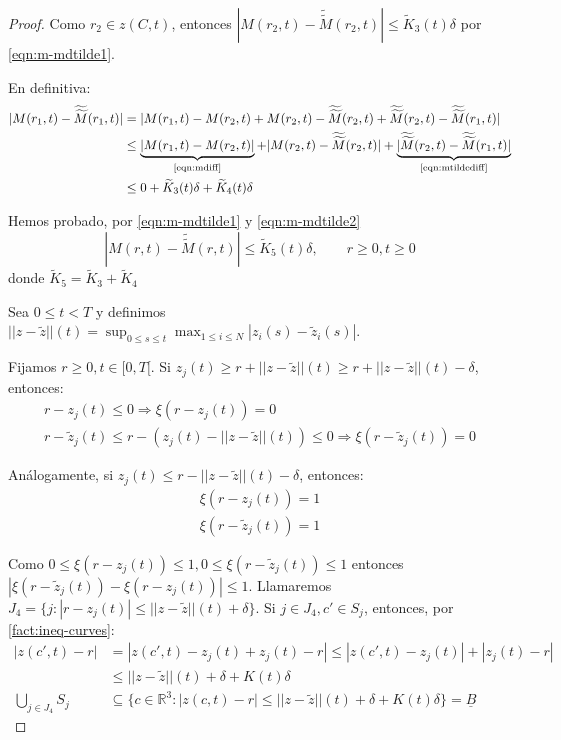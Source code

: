 \documentclass[a4paper,10pt]{scrartcl}
\theoremstyle{definition}
\newcommand{\ktilde}{\widetilde{K}}
\newcommand{\dtilde}[1]{\widetilde{\widetilde{#1}}}
\numberwithin{equation}{section}
\begin{document}
\begin{proof}
 Como $r_2 \in z(C,t)$, entonces $|M(r_2,t) - \dtilde{M}(r_2,t)| \le \ktilde_3(t) \delta$ por \eqref{eqn:m-mdtilde1}.
 
 En definitiva:
 \begin{align}  
|M(r_1,t) - \dtilde{M}(r_1,t)| &= |M(r_1,t) - M(r_2,t) + M(r_2,t) - \dtilde{M}(r_2,t) + \dtilde{M}(r_2,t) - \dtilde{M}(r_1,t)| \nonumber \\
&\le \underbrace{|M(r_1,t) - M(r_2,t)|}_{\textrm{\eqref{eqn:mdiff}}} + |M(r_2,t) - \dtilde{M}(r_2,t)| + \underbrace{|\dtilde{M}(r_2,t) - \dtilde{M}(r_1,t)|}_{\textrm{\eqref{eqn:mtildediff}}} \nonumber \\
&\le 0 + \ktilde_3(t) \delta + \ktilde_4(t) \delta \label{eqn:m-mdtilde2}
 \end{align}

 Hemos probado, por \eqref{eqn:m-mdtilde1} y  \eqref{eqn:m-mdtilde2}
 \begin{equation}
  |M(r,t) - \dtilde{M}(r,t)| \le \ktilde_5(t) \delta, \qquad r\ge 0, t\ge 0
  \label{eqn:m-mdtilde}
 \end{equation}
 donde $\ktilde_5 = \ktilde_3 + \ktilde_4$

 Sea $0\le t < T$ y definimos $||z-\widetilde{z}||(t) = \sup_{0\le s \le t} \max_{1\le i\le N} |z_i(s) - \widetilde{z}_i(s)|$.
 
 Fijamos $r\ge 0, t\in [0, T[$. Si $z_j(t) \ge r + ||z - \widetilde{z}||(t) \ge r + ||z - \widetilde{z}||(t) - \delta$, entonces:
 \begin{align*}
  r - z_j(t) \le 0 \Rightarrow \xi(r - z_j(t)) = 0\\
  r - \widetilde{z}_j(t) \le r - (z_j(t) - ||z-\widetilde{z}||(t)) \le 0 \Rightarrow \xi(r - \widetilde{z}_j(t)) = 0
 \end{align*}
 
 Análogamente, si $z_j(t) \le r - ||z - \widetilde{z}||(t) - \delta$, entonces:
  \begin{align*}
  \xi(r - z_j(t)) = 1\\
  \xi(r - \widetilde{z}_j(t)) = 1
 \end{align*}
 
 Como $0 \le \xi(r - z_j(t)) \le 1, 0 \le \xi(r - \widetilde{z}_j(t)) \le 1$ entonces $|\xi(r - \widetilde{z}_j(t)) - \xi(r - z_j(t))| \le 1$. Llamaremos $J_4 = \{j: |r-z_j(t)| \le ||z - \widetilde{z}||(t) + \delta\}$.  Si $j\in J_4, c' \in S_j$, entonces, por \cref{fact:ineq-curves}:
 \begin{align*}
  |z(c',t) - r| &= |z(c',t) - z_j(t) + z_j(t) - r| \le |z(c',t) - z_j(t)| + |z_j(t) - r|  \\
  &\le ||z-\widetilde{z}||(t) + \delta + K(t)\delta\\
  \bigcup_{j\in J_4} S_j &\subseteq \{c\in \mathbb{R}^3: |z(c,t) - r| \le ||z-\widetilde{z}||(t) + \delta + K(t)\delta\} = \underline{B}
 \end{align*}


\end{proof}
\end{document}
